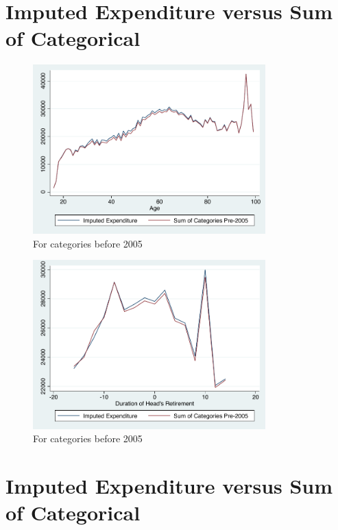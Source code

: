 \documentclass[11pt,onecolumn]{article}
\begin{document}
\clearpage

\section{Imputed Expenditure versus Sum of Categorical}

\begin{figure}[h]
	\caption{For categories before 2005}
	\centering
	\includegraphics[width=0.8\textwidth]{../ConsumptionPostRetirement/Comparision_of_imputed_and_categorical_age.pdf}
\end{figure}

\begin{figure}[h]
	\caption{For categories before 2005}
	\centering
	\includegraphics[width=0.8\textwidth]{../ConsumptionPostRetirement/Comparision_of_imputed_and_categorical_ret.pdf}
\end{figure}


\section{Imputed Expenditure versus Sum of Categorical}
\end{document}
